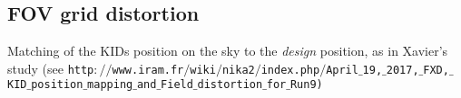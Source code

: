 \subsection{FOV grid distortion}

Matching of the KIDs position on the sky to the \emph{design} position, as in Xavier's study (see \tt{http$://$www.iram.fr$/$wiki$/$nika2$/$index.php$/$April$\_$19,$\_$2017,$\_$FXD,$\_$KID$\_$position$\_$mapping$\_$and$\_$Field$\_$distortion$\_$for$\_$Run9})
